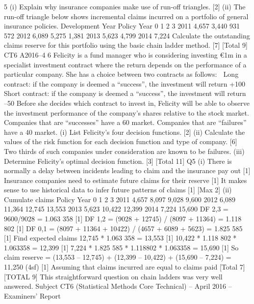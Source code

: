 5 (i) Explain why insurance companies make use of run-off triangles. [2]
(ii) The run-off triangle below shows incremental claims incurred on a portfolio of
general insurance policies.
Development Year
Policy Year 0 1 2 3
2011 4,657 3,440 931 572
2012 6,089 5,275 1,381
2013 5,623 4,799
2014 7,224
Calculate the outstanding claims reserve for this portfolio using the basic
chain ladder method. [7]
[Total 9]
CT6 A2016–4
6 Felicity is a fund manager who is considering investing €1m in a specialist
investment contract where the return depends on the performance of a particular
company. She has a choice between two contracts as follows:
   Long contract: if the company is deemed a “success”, the investment will return
+100%
 Short contract: if the company is deemed a “success”, the investment will return
–50%
Before she decides which contract to invest in, Felicity will be able to observe the
investment performance of the company’s shares relative to the stock market.
Companies that are “successes” have a 60%
market. Companies that are “failures” have a 40%
market.
(i) List Felicity’s four decision functions. [2]
(ii) Calculate the values of the risk function for each decision function and type
of company. [6]
Two thirds of such companies under consideration are known to be failures.
(iii) Determine Felicity’s optimal decision function. [3]
[Total 11]
  Q5 (i) There is normally a delay between incidents leading to claim and the insurance
pay out [1]
Insurance companies need to estimate future claims for their reserve [1]
It makes sense to use historical data to infer future patterns of claims [1]
[Max 2]
(ii) Cumulate claims
Policy
Year
0 1 2 3
2011 4,657 8,097 9,028 9,600
2012 6,089 11,364 12,745 13,553
2013 5,623 10,422 12,399
2014 7,224 15,690
DF 2,3 = 9600/9028 = 1.063 358 [1]
DF 1,2 = (9028 + 12745) / (8097 + 11364) = 1.118 802 [1]
DF 0,1 = (8097 + 11364 + 10422) / (4657 + 6089 + 5623) = 1.825 585 [1]
Find expected claims 12,745 * 1.063 358 = 13,553 [1]
10,422 * 1.118 802 * 1.063358 = 12,399 [1]
7,224 * 1.825 585 * 1.118802 * 1.063358 = 15,690 [1]
So claim reserve =
  (13,553 – 12,745) + (12,399 – 10,422) + (15,690 – 7,224) = 11,250 (4sf) [1]
Assuming that claims incurred are equal to claims paid
[Total 7]
[TOTAL 9]
This straightforward question on chain ladders was very well answered.
Subject CT6 (Statistical Methods Core Technical) – April 2016 – Examiners’ Report
